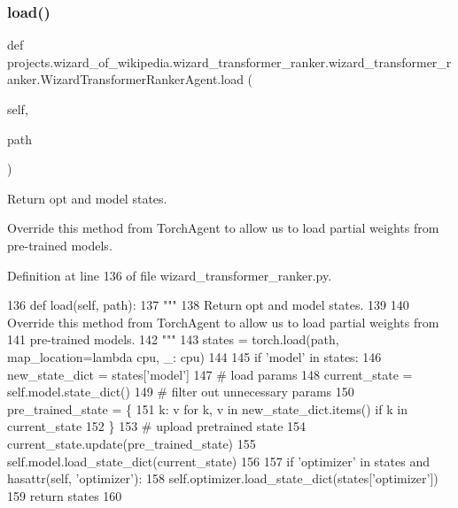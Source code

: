\subsubsection{\texorpdfstring{load()}{load()}}
{\footnotesize\ttfamily def projects.\+wizard\+\_\+of\+\_\+wikipedia.\+wizard\+\_\+transformer\+\_\+ranker.\+wizard\+\_\+transformer\+\_\+ranker.\+Wizard\+Transformer\+Ranker\+Agent.\+load (\begin{DoxyParamCaption}\item[{}]{self,  }\item[{}]{path }\end{DoxyParamCaption})}

\begin{DoxyVerb}Return opt and model states.

Override this method from TorchAgent to allow us to load partial weights from
pre-trained models.
\end{DoxyVerb}
 

Definition at line 136 of file wizard\+\_\+transformer\+\_\+ranker.\+py.


\begin{DoxyCode}
136     \textcolor{keyword}{def }load(self, path):
137         \textcolor{stringliteral}{"""}
138 \textcolor{stringliteral}{        Return opt and model states.}
139 \textcolor{stringliteral}{}
140 \textcolor{stringliteral}{        Override this method from TorchAgent to allow us to load partial weights from}
141 \textcolor{stringliteral}{        pre-trained models.}
142 \textcolor{stringliteral}{        """}
143         states = torch.load(path, map\_location=\textcolor{keyword}{lambda} cpu, \_: cpu)
144 
145         \textcolor{keywordflow}{if} \textcolor{stringliteral}{'model'} \textcolor{keywordflow}{in} states:
146             new\_state\_dict = states[\textcolor{stringliteral}{'model'}]
147             \textcolor{comment}{# load params}
148             current\_state = self.model.state\_dict()
149             \textcolor{comment}{# filter out unnecessary params}
150             pre\_trained\_state = \{
151                 k: v \textcolor{keywordflow}{for} k, v \textcolor{keywordflow}{in} new\_state\_dict.items() \textcolor{keywordflow}{if} k \textcolor{keywordflow}{in} current\_state
152             \}
153             \textcolor{comment}{# upload pretrained state}
154             current\_state.update(pre\_trained\_state)
155             self.model.load\_state\_dict(current\_state)
156 
157         \textcolor{keywordflow}{if} \textcolor{stringliteral}{'optimizer'} \textcolor{keywordflow}{in} states \textcolor{keywordflow}{and} hasattr(self, \textcolor{stringliteral}{'optimizer'}):
158             self.optimizer.load\_state\_dict(states[\textcolor{stringliteral}{'optimizer'}])
159         \textcolor{keywordflow}{return} states
160 \end{DoxyCode}


